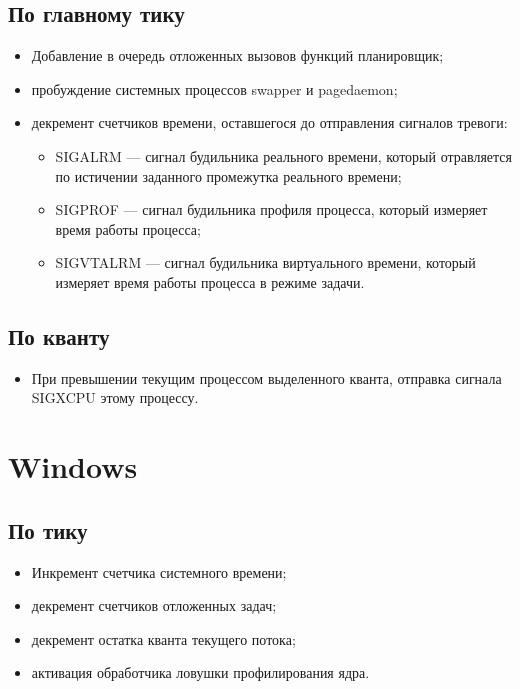 \documentclass[12pt]{report}
\begin{document}
\subsection{По главному тику}
\begin{itemize}
	\item	Добавление в очередь отложенных вызовов функций планировщик;
	\item	пробуждение системных процессов swapper и pagedaemon;
	
	\item	декремент счетчиков времени, оставшегося до отправления сигналов тревоги:
	\begin{itemize}
		\item	SIGALRM — сигнал будильника реального времени, который отравляется по истичении заданного промежутка реального времени;
		\item	SIGPROF — сигнал будильника профиля процесса, который измеряет время работы процесса;
		\item	SIGVTALRM — сигнал будильника виртуального времени,
		который измеряет время работы процесса в режиме задачи.
	\end{itemize}
\end{itemize}

\subsection{По кванту}

\begin{itemize}
	\item При превышении текущим процессом выделенного кванта, отправка сигнала SIGXCPU этому процессу.
\end{itemize}

\section{Windows}
\subsection{По тику}
\begin{itemize}
	\item Инкремент счетчика системного времени;
	\item декремент счетчиков отложенных задач;
	\item декремент остатка кванта текущего потока;
	\item активация обработчика ловушки профилирования ядра.
\end{itemize}
\end{document}
